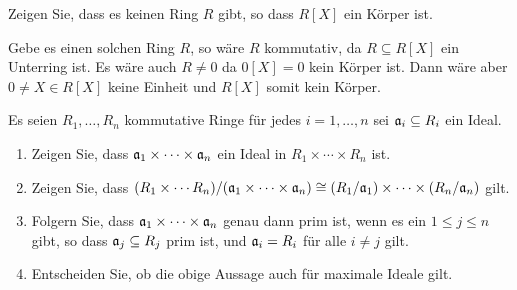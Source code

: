 \begin{question}
  \label{qst: polynomial rings are not fields}
  Zeigen Sie, dass es keinen Ring $R$ gibt, so dass $R[X]$ ein Körper ist.
\end{question}


\begin{solution}
  Gebe es einen solchen Ring $R$, so wäre $R$ kommutativ, da $R \subseteq R[X]$ ein Unterring ist.
  Es wäre auch $R \neq 0$ da $0[X] = 0$ kein Körper ist.
  Dann wäre aber $0 \neq X \in R[X]$ keine Einheit und $R[X]$ somit kein Körper.
\end{solution}


\begin{question}
  \label{question: product of ideals is an ideal}
  Es seien $R_1, \dotsc, R_n$ kommutative Ringe für jedes $i = 1, \dotsc, n$ sei $\mathfrak{a}_i \subseteq R_i$ ein Ideal.
  \begin{enumerate}
    \item
      Zeigen Sie, dass $\mathfrak{a}_1 \times \dotsb \times \mathfrak{a}_n$ ein Ideal in $R_1 \times \dotsb \times R_n$ ist.
    \item
      Zeigen Sie, dass $(R_1 \times \dotsb R_n)/(\mathfrak{a}_1 \times \dotsb \times \mathfrak{a}_n) \cong (R_1/\mathfrak{a}_1) \times \dotsb \times (R_n/\mathfrak{a}_n)$ gilt.
    \item
      Folgern Sie, dass $\mathfrak{a}_1 \times \dotsb \times \mathfrak{a}_n$ genau dann prim ist, wenn es ein $1 \leq j \leq n$ gibt, so dass $\mathfrak{a}_j \subseteq R_j$ prim ist, und $\mathfrak{a}_i = R_i$ für alle $i \neq j$ gilt.
    \item
      Entscheiden Sie, ob die obige Aussage auch für maximale Ideale gilt.
  \end{enumerate}
\end{question}


